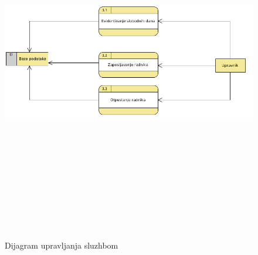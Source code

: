\documentclass[10 pt]{article}
\begin{document}
	\begin{figure}[H]
		\centering
		\includegraphics[width=15cm,height=15cm,keepaspectratio]{slike/UpravljanjeSluzbom.png}\\
		\caption{Dijagram upravljanja sluzhbom}
	\end{figure}
	
\end{document}
